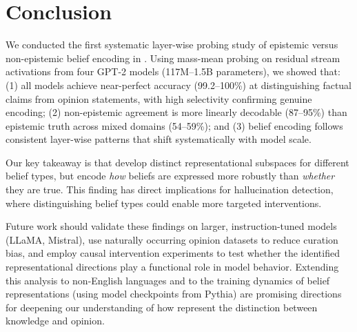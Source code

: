 \section{Conclusion}
\label{sec:conclusion}

We conducted the first systematic layer-wise probing study of epistemic versus non-epistemic belief encoding in \llms. Using mass-mean probing on residual stream activations from four GPT-2 models (117M--1.5B parameters), we showed that: (1) all models achieve near-perfect accuracy (99.2--100\%) at distinguishing factual claims from opinion statements, with high selectivity confirming genuine encoding; (2) non-epistemic agreement is more linearly decodable (87--95\%) than epistemic truth across mixed domains (54--59\%); and (3) belief encoding follows consistent layer-wise patterns that shift systematically with model scale.

Our key takeaway is that \llms develop distinct representational subspaces for different belief types, but encode \emph{how} beliefs are expressed more robustly than \emph{whether} they are true. This finding has direct implications for hallucination detection, where distinguishing belief types could enable more targeted interventions.

Future work should validate these findings on larger, instruction-tuned models (\eg LLaMA, Mistral), use naturally occurring opinion datasets to reduce curation bias, and employ causal intervention experiments to test whether the identified representational directions play a functional role in model behavior. Extending this analysis to non-English languages and to the training dynamics of belief representations (using model checkpoints from Pythia) are promising directions for deepening our understanding of how \llms represent the distinction between knowledge and opinion.
